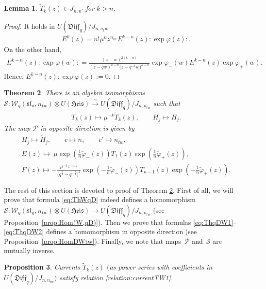 \documentclass[pdftex]{sigma}
\numberwithin{equation}{section}
\newtheorem{Theorem}{Theorem}[section]
\newtheorem{Proposition}[Theorem]{Proposition}
\newtheorem{Lemma}[Theorem]{Lemma}
\theoremstyle{definition}
\newcommand{\half}{\frac{1}{2}}
\newcommand{\qD}{\mathfrak{Diff}_q}
\newcommand{\T}{\tilde{T}}
\newcommand{ \twW }{ \mathcal{W}_{q} ( \mathfrak{sl}_n, n_{tw} ) }
\newcommand{\tphi}{\tilde{\varphi}}
\newcommand{\WqD}{\mathcal{S}}
\newcommand{\qDW}{\mathcal{P}}
\newcommand{\UH}{\otimes U(\mathfrak{Heis})}
\newcommand{\WH}{\twW \UH}
\newcommand{\ha}{\tilde{H}}
\begin{document}
\begin{Lemma} \label{lemma:T_k for big k}
$\T_k(z) \in J_{n,n'}$ for $k>n$.
\end{Lemma}
\begin{proof}
It holds in $U(\qD)/J_{n,n_tw}$
\begin{gather*}
E^{k}(z) = n! \mu^n z^{n_{tw}}E^{k-n}(z) : \! \exp{\varphi(z)} \! :.
\end{gather*}
On the other hand,
\begin{gather*}
E^{k-n}(z) :\!\exp{\varphi(w)}\!: = \frac{(z-w)^{2(k-n)}}{(z-qw)^{k-n}\big(z-q^{-1}w\big)^{k-n}} \exp{\varphi_-(w)} E^{k-n}(z) \exp{\varphi_+(w)}.
\end{gather*}
Hence, $E^{k-n}(z) :\!\exp{\varphi(z)} \!:=0$.
\end{proof}

\begin{Theorem} \label{Th:Wiso}
There is an algebra isomorphisms $\WqD \colon \WH \xrightarrow{\sim} U(\qD)/J_{n,n_{tw}}$ such that
\begin{gather}
T_k(z) \mapsto \mu^{-k} \T_k(z), \qquad
\ha_j \mapsto H_j. \label{eq:ThWqD}
\end{gather}
The map $\qDW$ in opposite direction is given by
\begin{gather}
H_j \mapsto \ha_j, \qquad c \mapsto n, \qquad c' \mapsto n_{tw}, \label{eq:ThqDW1}\\
E(z) \mapsto \ \mu \exp \left( \frac{1}{n}{\tphi_-(z)} \right) T_1(z) \exp \left( \frac{1}{n} \tphi_+ (z) \right), \label{eqThqDWE}\\
F(z) \mapsto - \frac{\mu^{-1} z^{-n_{tw}}}{\big(q^{\half}-q^{-\half}\big)^2} \exp \left(- \frac{1}{n}{\tphi_-(z)} \right) T_{n-1}(z) \exp \left(-\frac{1}{n} \tphi_+ (z) \right). \label{eq:ThqDW2}
\end{gather}
\end{Theorem}

The rest of this section is devoted to proof of Theorem \ref{Th:Wiso}. First of all, we will prove that formula \eqref{eq:ThWqD} indeed defines a homomorphism $\WqD \colon \WH \rightarrow U(\qD)/J_{n,n_{tw}}$ (see Proposition~\ref{prop:Hom(W,qD)}). Then we prove that formulas \eqref{eq:ThqDW1}--\eqref{eq:ThqDW2} defines a homomorphism in opposite direction (see Proposition~\ref{prop:HomDWtw}). Finally, we note that maps~$\qDW$ and~$\WqD$ are mutually inverse.

\begin{Proposition} \label{prop:W1}
Currents $\T_k(z)$ %
$($as power series with coefficients in $U(\qD)/J_{n,n_{tw}})$ satisfy relation \eqref{relation:currentTW1}.
\end{Proposition}
\end{document}
